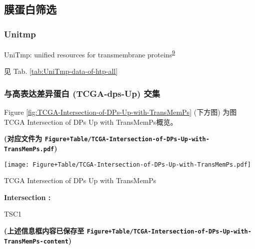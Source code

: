 \documentclass[
]{article}
\begin{document}
\hypertarget{ux819cux86cbux767dux7b5bux9009-1}{%
\subsection{膜蛋白筛选}\label{ux819cux86cbux767dux7b5bux9009-1}}

\hypertarget{unitmp-1}{%
\subsubsection{Unitmp}\label{unitmp-1}}

UniTmp: unified resources for transmembrane proteins\textsuperscript{\protect\hyperlink{ref-UnitmpUnifiedDobson2024}{9}}

见 Tab. \ref{tab:UniTmp-data-of-htp-all}

\hypertarget{ux4e0eux9ad8ux8868ux8fbeux5deeux5f02ux86cbux767d-tcga-dps-up-ux4ea4ux96c6}{%
\subsubsection{与高表达差异蛋白 (TCGA-dps-Up) 交集}\label{ux4e0eux9ad8ux8868ux8fbeux5deeux5f02ux86cbux767d-tcga-dps-up-ux4ea4ux96c6}}

Figure \ref{fig:TCGA-Intersection-of-DPs-Up-with-TransMemPs} (下方图) 为图TCGA Intersection of DPs Up with TransMemPs概览。

\textbf{(对应文件为 \texttt{Figure+Table/TCGA-Intersection-of-DPs-Up-with-TransMemPs.pdf})}

\def\@captype{figure}
\begin{center}
\texttt{[image: Figure+Table/TCGA-Intersection-of-DPs-Up-with-TransMemPs.pdf]}
\caption{TCGA Intersection of DPs Up with TransMemPs}\label{fig:TCGA-Intersection-of-DPs-Up-with-TransMemPs}
\end{center}
\begin{center}\begin{tcolorbox}[colback=gray!10, colframe=gray!50, width=0.9\linewidth, arc=1mm, boxrule=0.5pt]
\textbf{
Intersection
:}

\vspace{0.5em}

    TSC1

\vspace{2em}
\end{tcolorbox}
\end{center}

\textbf{(上述信息框内容已保存至 \texttt{Figure+Table/TCGA-Intersection-of-DPs-Up-with-TransMemPs-content})}
\end{document}
